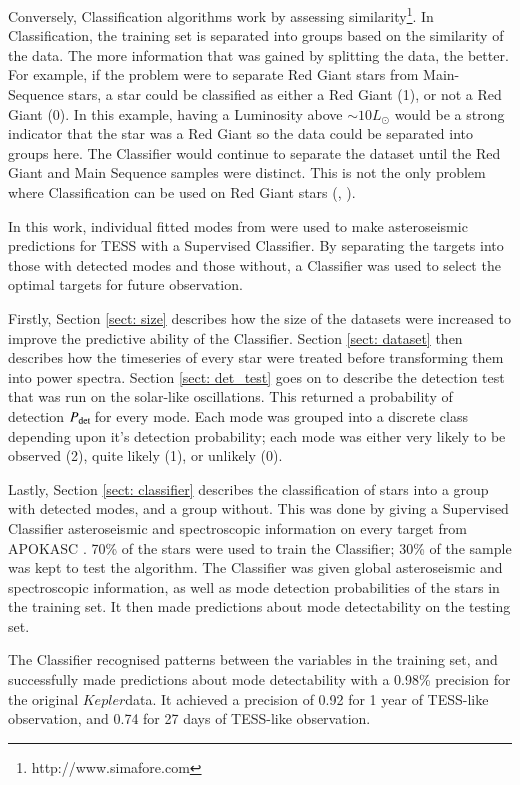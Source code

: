 \documentclass[a4paper,fleqn,usenatbib,useAMS]{mnras}
\newcommand{\kep}{\ensuremath{Kepler}\:}
\newcommand{\pdet}{\ensuremath{P_{\rm det}\:}}
\begin{document}
Conversely, Classification algorithms work by assessing similarity\footnote{http://www.simafore.com}. In Classification, the training set is separated into groups based on the similarity of the data. The more information that was gained by splitting the data, the better. For example, if the problem were to separate Red Giant stars from Main-Sequence stars, a star could be classified as either a Red Giant (1), or not a Red Giant (0). In this example, having a Luminosity above $\sim10L_{\odot}$ would be a strong indicator that the star was a Red Giant so the data could be separated into groups here. The Classifier would continue to separate the dataset until the Red Giant and Main Sequence samples were distinct. This is not the only problem where Classification can be used on Red Giant stars (\citet{ness_cannon_2015}, \citet{wu_mass_2017}).

In this work, individual fitted modes from \citet{davies_asteroseismology_2016} were used to make asteroseismic predictions for TESS with a Supervised Classifier. By separating the targets into those with detected modes and those without, a Classifier was used to select the optimal targets for future observation.

Firstly, Section \ref{sect: size} describes how the size of the datasets were increased to improve the predictive ability of the Classifier. Section \ref{sect: dataset} then describes how the timeseries of every star were treated before transforming them into power spectra. Section \ref{sect: det_test} goes on to describe the detection test that was run on the solar-like oscillations. This returned a probability of detection \pdet for every mode. Each mode was grouped into a discrete class depending upon it's detection probability; each mode was either very likely to be observed (2), quite likely (1), or unlikely (0).

Lastly, Section \ref{sect: classifier} describes the classification of stars into a group with detected modes, and a group without. This was done by giving a Supervised Classifier asteroseismic and spectroscopic information on every target from APOKASC \citep{pinsonneault_apokasc_2014}. 70\% of the stars were used to train the Classifier; 30\% of the sample was kept to test the algorithm. The Classifier was given global asteroseismic and spectroscopic information, as well as mode detection probabilities of the stars in the training set. It then made predictions about mode detectability on the testing set.

The Classifier recognised patterns between the variables in the training set, and successfully made predictions about mode detectability with a 0.98\% precision for the original \kep data. It achieved a precision of 0.92 for 1 year of TESS-like observation, and 0.74 for 27 days of TESS-like observation.
\end{document}
